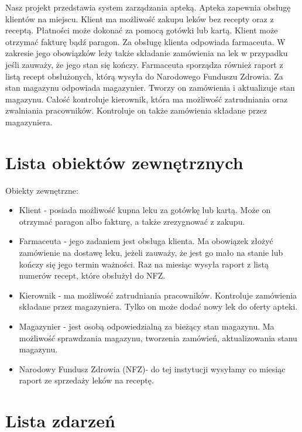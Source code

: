 \documentclass[a4paper, 11pt]{article}
\begin{document}
	Nasz projekt przedstawia system zarządzania apteką. \newline
	\newline \indent 
	Apteka zapewnia obsługę klientów na miejscu.
	Klient ma możliwość zakupu leków bez recepty oraz z receptą. Płatności może dokonać za pomocą gotówki lub kartą. Klient może otrzymać fakturę bądź paragon.  \newline 
	\newline \indent
	Za obsługę klienta  odpowiada farmaceuta. W zakresie jego obowiązków leży także składanie zamówienia na lek w przypadku jeśli zauważy, że jego stan się kończy. Farmaceuta sporządza również raport z listą recept obsłużonych, którą wysyła do Narodowego Funduszu Zdrowia. \newline
	\newline \indent
	Za stan magazynu odpowiada magazynier. Tworzy on zamówienia i aktualizuje stan magazynu. \newline   
	\newline \indent
	Całość kontroluje kierownik, która ma możliwość zatrudniania oraz zwalniania pracowników. Kontroluje on także zamówienia składane przez magazyniera.	
	\section{Lista obiektów zewnętrznych}
	Obiekty zewnętrzne:
	\begin{itemize}
	\item Klient - posiada możliwość kupna leku za gotówkę lub kartą. Może on otrzymać paragon albo fakturę, a także zrezygnować z zakupu.
	\item Farmaceuta - jego zadaniem jest obsługa klienta. Ma obowiązek złożyć zamówienie na dostawę leku, jeżeli zauważy, że jest go mało na stanie lub kończy się jego termin ważności. Raz na miesiąc wysyła raport z listą numerów recept, które obsłużył do NFZ.
	\item Kierownik - ma możliwość zatrudniania pracowników. Kontroluje zamówienia składane przez magazyniera. Tylko on może dodać nowy lek do oferty apteki.
	\item Magazynier - jest osobą odpowiedzialną za bieżący stan magazynu. Ma możliwość sprawdzania magazynu, tworzenia zamówień, aktualizowania stanu magazynu.
	\item Narodowy Fundusz Zdrowia (NFZ)- do tej instytucji wysyłamy co miesiąc raport ze sprzedaży leków na receptę. 
	\end{itemize}
	\section{Lista zdarzeń}
	
\end{document}
